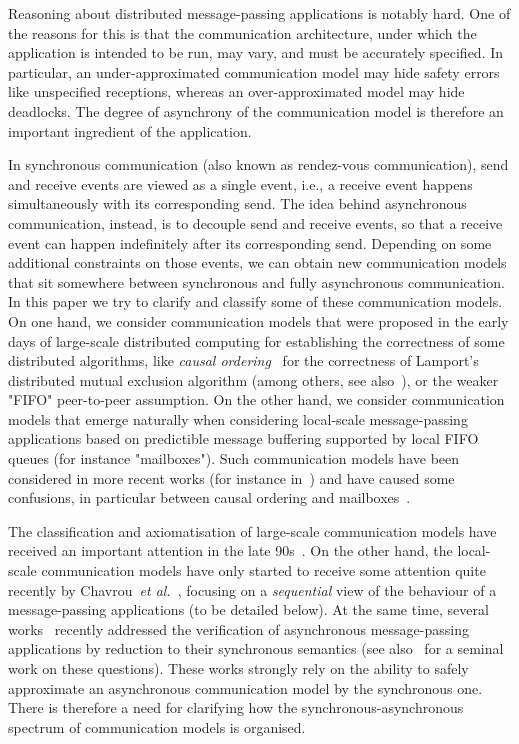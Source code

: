

Reasoning about distributed message-passing applications is notably hard. One of the reasons for this
is that the communication architecture, under which the application is intended to be run, may vary, and must be accurately specified. In particular, an under-approximated communication model may hide safety errors
like unspecified receptions, whereas an over-approximated model may hide deadlocks. The degree of asynchrony
of the communication model is therefore an important ingredient of the application.

In synchronous communication (also known as rendez-vous communication), send and receive events are viewed as
a single event, i.e., a receive event happens simultaneously with its corresponding send. The idea behind asynchronous communication, instead, is to decouple send and receive events, so that a receive event can happen indefinitely after its corresponding send. Depending on some additional constraints on those events, we can obtain new communication models that sit somewhere between synchronous and fully asynchronous communication.
In this paper we try to clarify and classify some of these communication models.
On  one hand, we consider communication models that were proposed in the early days of large-scale distributed computing for establishing the correctness of some distributed algorithms, like \emph{causal ordering}~\cite{Lamport78} for the correctness of Lamport's distributed mutual exclusion algorithm (among others, see also~\cite{Renesse93}), or the weaker "FIFO" peer-to-peer assumption. On the other hand, we consider communication models that emerge
naturally when considering local-scale message-passing applications based on predictible
message buffering supported by local FIFO queues (for instance "mailboxes"). Such communication models have
been considered in more recent works (for instance in~\cite{DBLP:journals/tcs/BasuB16}) and have caused
some confusions, in particular between causal ordering and mailboxes~\cite{DBLP:conf/cav/BouajjaniEJQ18,DBLP:conf/fossacs/GiustoLL20}.

The classification and axiomatisation of large-scale communication models have received an important attention in the late 90s~\cite{DBLP:journals/dc/Charron-BostMT96}. On the other hand, the local-scale communication models
have only started to receive some attention quite recently by Chavrou~\emph{et al.}~\cite{DBLP:journals/fac/ChevrouHQ16}, focusing on a \emph{sequential} view of the behaviour of a message-passing
applications (to be detailed below).
At the same time, several works~\cite{KraglQH18,GleissenthallKB19,DBLP:conf/cav/BouajjaniEJQ18,DBLP:conf/cav/LangeY19} recently addressed the verification of
asynchronous message-passing applications by reduction to their synchronous semantics (see also~\cite{Lipton75} for a seminal work on these questions). These works strongly rely on the ability to safely approximate an asynchronous communication model by the synchronous one. There is therefore a need for clarifying how the synchronous-asynchronous spectrum of communication models is organised.

